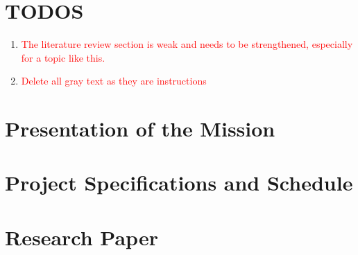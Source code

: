 \documentclass[10pt]{article}
\title{\mytitle}
\author{\myauthor}
\date{}
\begin{document}
    

    


    \section*{TODOS}\label{sec:todos}
    \begin{enumerate}
        \item\textcolor{red}
        {The literature review section is weak and needs to be strengthened, especially for a topic like this.}
        \item\textcolor{red}
        {Delete all gray text as they are instructions}
    \end{enumerate}


    \section{Presentation of the Mission}\label{sec:presentation-of-the-mission}
    


    \section{Project Specifications and Schedule}\label{sec:project-specifications-and-schedule}
    


    \section{Research Paper}\label{sec:research-paper}
    

    
\end{document}

